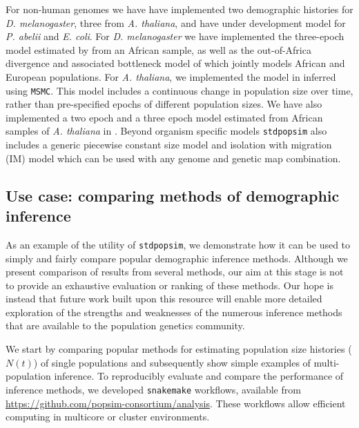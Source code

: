\documentclass[12pt,halfline,a4paper]{ouparticle}
\newcommand{\stdpopsim}{\texttt{stdpopsim}\xspace}
\newcommand{\MSMC}{\texttt{MSMC}\xspace}
\begin{document}
For non-human genomes we have have implemented two demographic histories for
\emph{D. melanogaster}, three from \emph{A. thaliana}, and have under development
model for \emph{P. abelii} and \emph{E. coli}.
For \emph{D. melanogaster} we have implemented the three-epoch model estimated by \cite{sheehan2016deep} from
an African sample, as well as the out-of-Africa divergence
and associated bottleneck model of \cite{li2006inferring} which jointly models African
and European populations. For \emph{A. thaliana}, we implemented the
model in \cite{durvasula2017african} inferred using \MSMC. This model includes
a continuous change in population size over time, rather than pre-specified epochs of different
population sizes. We have also implemented a two epoch and a three epoch model estimated from African
samples of \emph{A. thaliana} in \cite{huber2018gene}. 
Beyond organism specific models \stdpopsim also includes a generic piecewise constant size model and
isolation with migration (IM) model which can be used with any genome and genetic map combination.

\subsection*{Use case: comparing methods of demographic inference}
As an example of the utility of \stdpopsim, we demonstrate how it can be used
to simply and fairly compare popular demographic inference methods.
Although we present comparison of results from several
methods, our aim at this stage is not to provide an exhaustive
evaluation or ranking of these methods. Our hope is instead that future work built upon this resource
will enable more detailed exploration of the strengths and weaknesses of the numerous
inference methods that are available to the population genetics community.

We start by comparing popular methods for estimating
population size histories ($N(t)$) of single populations and subsequently
show simple examples of multi-population inference.
To reproducibly evaluate and compare the performance of inference methods, we developed
\texttt{snakemake} \citep{koster2012snakemake} workflows,
available from \url{https://github.com/popsim-consortium/analysis}.
These workflows allow efficient computing in multicore or cluster environments.
\end{document}
